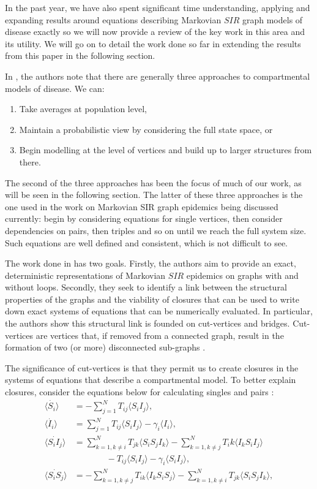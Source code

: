 \documentclass[../report.tex]{subfiles}
\begin{document}
In the past year, we have also spent significant time understanding, applying and expanding results around equations describing Markovian $SIR$ graph models of disease exactly \cite{kiss_2014} so we will now provide a review of the key work in this area and its utility. We will go on to detail the work done so far in extending the results from this paper in the following section.

In \cite{kiss_2014}, the authors note that there are generally three approaches to compartmental models of disease. We can:
\begin{enumerate}
	\item Take averages at population level, 
	\item Maintain a probabilistic view by considering the full state space, or
	\item Begin modelling at the level of vertices and build up to larger structures from there.
\end{enumerate}

The second of the three approaches has been the focus of much of our work, as will be seen in the following section. The latter of these three approaches is the one used in the work on Markovian SIR graph epidemics being discussed currently: begin by considering equations for single vertices, then consider dependencies on pairs, then triples and so on until we reach the full system size. Such equations are well defined and consistent, which is not difficult to see.

The work done in \cite{kiss_2014} has two goals. Firstly, the authors aim to provide an exact, deterministic representations of Markovian $SIR$ epidemics on graphs with and without loops. Secondly, they seek to identify a link between the structural properties of the graphs and the viability of closures that can be used to write down exact systems of equations that can be numerically evaluated. In particular, the authors show this structural link is founded on cut-vertices and bridges. Cut-vertices are vertices that, if removed from a connected graph, result in the formation of two (or more) disconnected sub-graphs \cite{kiss_2014}.

The significance of cut-vertices is that they permit us to create closures in the systems of equations that describe a compartmental model. To better explain closures, consider the equations below for calculating singles and pairs \cite{kiss_2014}:
\begin{align*}
\langle \dot{S_i} \rangle & = -\sum^N_{j=1}T_{ij}\langle S_iI_j\rangle,\\
\langle\dot{I_i}\rangle & = \sum^N_{j=1}T_{ij}\langle S_iI_j\rangle - \gamma_i\langle I_i \rangle,\\
\langle\dot{S_iI_j}\rangle & = \sum^N_{k=1,k\neq i}T_{jk}\langle S_i S_j I_k \rangle - \sum^N_{k=1,k\neq j}T_ik\langle I_k S_i I_j \rangle \\ 
			    	      & ~~~~~~~~~~~~~~~~~- T_{ij}\langle S_iI_j \rangle - \gamma_i\langle S_i I_j \rangle,\\
\langle \dot{S_i S_j}\rangle & = - \sum^N_{k=1,k\neq j}T_{ik}\langle I_k S_i S_j \rangle - \sum^N_{k=1,k\neq i}T_{jk}\langle S_i S_j I_k \rangle,
\end{align*}
\end{document}
